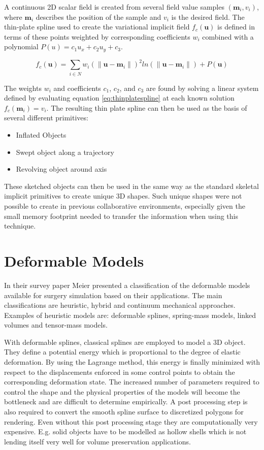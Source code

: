 A continuous 2D scalar field is created from several field value samples $(\mathbf{m}_i, v_i)$, where $\mathbf{m}_i$ describes the 
position of the sample and $v_i$ is the desired field. The thin-plate spline used to create the variational 
implicit field $f_c(\mathbf{u})$ is defined in terms of these points weighted by corresponding coefficients $w_i$ combined with a polynomial 
$P(u) = c_1u_x +c_2u_y +c_3$.

\begin{equation}
f_c(\mathbf{u}) = \sum_{i \in N} w_i(\|\mathbf{u}-\mathbf{m}_i\|)^2ln(\|\mathbf{u}-\mathbf{m}_i\|)+P(\mathbf{u}) 
\label{eq:thinplatespline}
\end{equation}

The weights $w_i$ and coefficients $c_1$, $c_2$, and $c_3$ are found by solving a linear system defined by evaluating 
equation \ref{eq:thinplatespline} at each known solution $f_c(\mathbf{m}_i)=v_i$.
The resulting thin plate spline can then be used as the basis of several different primitives:

\begin{itemize}
 \item Inflated Objects
 \item Swept object along a trajectory
 \item Revolving object around axis
\end{itemize}

These sketched objects can then be used in the same way as the standard skeletal implicit primitives to create unique 3D shapes. Such 
unique shapes were not possible to create in previous collaborative environments, especially given the small memory footprint 
needed to transfer the information when using this technique.

\section{Deformable Models}
In their survey paper Meier \etal \cite{Meier2005} presented a classification of the deformable models available for surgery 
simulation based on their applications. The main classifications are heuristic, hybrid and continuum mechanical approaches.
Examples of heuristic models are: deformable splines, spring-mass models, linked volumes and tensor-mass models. 

With deformable splines, classical splines are employed to model a 3D object. They define a potential energy which is proportional
to the degree of elastic deformation. By using the Lagrange method, this energy is finally minimized with respect to the displacements
enforced in some control points to obtain the corresponding deformation state. The increased number of parameters required to control
the shape and the physical properties of the models will become the bottleneck and are difficult to determine empirically. A post processing
step is also required to convert the smooth spline surface to discretized polygons for rendering. Even without this post processing stage
they are computationally very expensive. E.g. solid objects have to be modelled as hollow shells which is not lending itself very well for
volume preservation applications.

